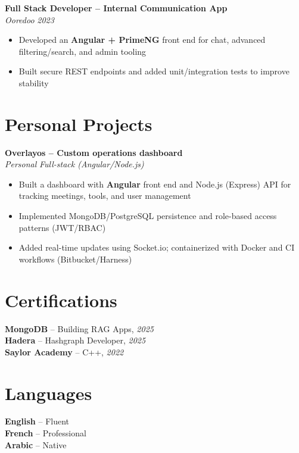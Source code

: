 \documentclass[10pt,a4paper]{article}
\begin{document}
{\vspace{3pt}
\textbf{Full Stack Developer -- Internal Communication App}\\[1pt]
\textit{Ooredoo} \hfill \textit{2023}
\begin{itemize}
  \item Developed an \textbf{Angular + PrimeNG} front end for chat, advanced filtering/search, and admin tooling
  \item Built secure REST endpoints and added unit/integration tests to improve stability
\end{itemize}

}

\vspace{4pt}
\section*{Personal Projects}
{\small
\textbf{Overlayos -- Custom operations dashboard}\\[1pt]
\textit{Personal} \hfill \textit{Full-stack (Angular/Node.js)}
\begin{itemize}
  \item Built a dashboard with \textbf{Angular} front end and Node.js (Express) API for tracking meetings, tools, and user management
  \item Implemented MongoDB/PostgreSQL persistence and role-based access patterns (JWT/RBAC)
  \item Added real-time updates using Socket.io; containerized with Docker and CI workflows (Bitbucket/Harness)
\end{itemize}

}

\vspace{3pt}
\section*{Certifications}
{\small
\textbf{MongoDB} -- Building RAG Apps, \textit{2025}\\[1pt]
\textbf{Hadera} -- Hashgraph Developer, \textit{2025}\\[1pt]
\textbf{Saylor Academy} -- C++, \textit{2022}
}

\section*{Languages}
{\small
\textbf{English} -- Fluent\\[1pt]
\textbf{French} -- Professional\\[1pt]
\textbf{Arabic} -- Native
}
\end{document}
